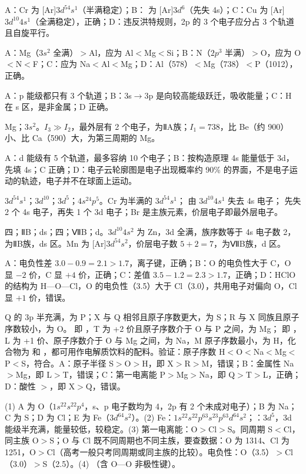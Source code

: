 \begin{jiexilist}
\item {}A：Cr 为 [Ar]$3d^54s^1$（半满稳定）；B： 为 [Ar]$3d^6$（先失 4s）；C：Cu 为 [Ar]$3d^{10}4s^1$（全满稳定），正确；D：违反洪特规则，2p 的 3 个电子应分占 3 个轨道且自旋平行。
\item {}A：Mg（$3s^2$ 全满）$>$Al，应为 Al$<$Mg$<$Si；B：N（$2p^3$ 半满）$>$O，应为 O$<$N$<$F；C：应为 Na$<$Al$<$Mg；D：Al（578）$<$Mg（738）$<$P（1012），正确。
\item {}A：p 能级都只有 3 个轨道；B：3s$\to$3p 是向较高能级跃迁，吸收能量；C：H 在 s 区，是非金属；D 正确。
\item Mg；$3s^2$。$I_3\gg I_2$，最外层有 2 个电子，为ⅡA族；$I_1=738$\kjmol{}，比 Be（约 900\kjmol{}）小、比 Ca（590\kjmol{}）大，为第三周期的 Mg。
\item {}A：d 能级有 5 个轨道，最多容纳 10 个电子；B：按构造原理 4s 能量低于 3d，先填 4s；C 正确；D：电子云轮廓图是电子出现概率约 90\% 的界面，不是电子运动的轨迹，电子并不在球面上运动。
\item $3d^54s^1$；$3d^{10}$；$3d^5$；$4s^24p^5$。Cr 为半满的 $3d^54s^1$； 由 $3d^{10}4s^1$ 失去 4s 电子； 先失 2 个 4s 电子，再失 1 个 3d 电子；Br 是主族元素，价层电子即最外层电子。
\item 四；ⅡB；ds；四；ⅦB；d。$3d^{10}4s^2$ 为 Zn，3d 全满，族序数等于 4s 电子数 2，为ⅡB族，ds 区。Mn 为 [Ar]$3d^54s^2$，价层电子数 $5+2=7$，为ⅦB族，d 区。
\item {}A：电负性差 $3.0-0.9=2.1>1.7$，离子键，正确；B：O 的电负性大于 C，O 显 $-2$ 价，C 显 $+4$ 价，正确；C：差值 $3.5-1.2=2.3>1.7$，正确；D：HClO 的结构为 H—O—Cl，O 的电负性（3.5）大于 Cl（3.0），共用电子对偏向 O，Cl 显 $+1$ 价，错误。
\item {}Q 的 3p 半充满，为 P；X 与 Q 相邻且原子序数更大，为 S；R 与 X 同族且原子序数较小，为 O。 即 ，T 为 +2 价且原子序数介于 O 与 P 之间，为 Mg； 即 ，L 为 +1 价、原子序数介于 O 与 Mg 之间，为 Na，M 原子序数最小，为 H，化合物为  和 ，都可用作电解质饮料的配料。验证：原子序数 H$<$O$<$Na$<$Mg$<$P$<$S，符合。A：原子半径 S$>$O$>$H，即 X$>$R$>$M，错误；B：金属性 Na$>$Mg，即 L$>$T，错误；C：第一电离能 P$>$Mg$>$Na，即 Q$>$T$>$L，正确；D：酸性 $>$，即 X$>$Q，错误。
\item (1) A 为 O（$1s^22s^22p^4$，s、p 电子数均为 4，2p 有 2 个未成对电子）；B 为 Na；C 为 S；D 为 Cl；E 为 Fe（$3d^64s^2$）。(2) Fe：$1s^22s^22p^63s^23p^63d^64s^2$；：$3d^5$，3d 能级半充满，能量较低，较稳定。(3) 第一电离能：O$>$Cl$>$S。同周期 S$<$Cl，同主族 O$>$S；O 与 Cl 既不同周期也不同主族，要查数据：O 为 1314\kjmol{}、Cl 为 1251\kjmol{}，O$>$Cl（高考一般只考同周期或同主族的比较）。电负性：O（3.5）$>$Cl（3.0）$>$S（2.5）。(4) （含 O—O 非极性键）。

\end{jiexilist}
